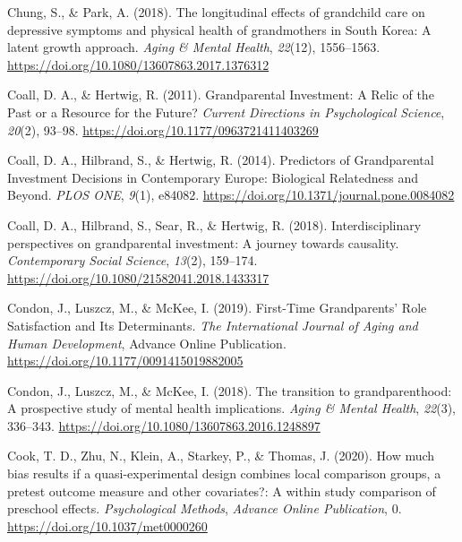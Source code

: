\documentclass[
  english,
  man, noextraspace]{apa7}
\begin{document}
\leavevmode\hypertarget{ref-chungLongitudinalEffectsGrandchild2018}{}%
Chung, S., \& Park, A. (2018). The longitudinal effects of grandchild care on depressive symptoms and physical health of grandmothers in South Korea: A latent growth approach. \emph{Aging \& Mental Health}, \emph{22}(12), 1556--1563. \url{https://doi.org/10.1080/13607863.2017.1376312}

\leavevmode\hypertarget{ref-coallGrandparentalInvestmentRelic2011}{}%
Coall, D. A., \& Hertwig, R. (2011). Grandparental Investment: A Relic of the Past or a Resource for the Future? \emph{Current Directions in Psychological Science}, \emph{20}(2), 93--98. \url{https://doi.org/10.1177/0963721411403269}

\leavevmode\hypertarget{ref-coallPredictorsGrandparentalInvestment2014}{}%
Coall, D. A., Hilbrand, S., \& Hertwig, R. (2014). Predictors of Grandparental Investment Decisions in Contemporary Europe: Biological Relatedness and Beyond. \emph{PLOS ONE}, \emph{9}(1), e84082. \url{https://doi.org/10.1371/journal.pone.0084082}

\leavevmode\hypertarget{ref-coallInterdisciplinaryPerspectivesGrandparental2018}{}%
Coall, D. A., Hilbrand, S., Sear, R., \& Hertwig, R. (2018). Interdisciplinary perspectives on grandparental investment: A journey towards causality. \emph{Contemporary Social Science}, \emph{13}(2), 159--174. \url{https://doi.org/10.1080/21582041.2018.1433317}

\leavevmode\hypertarget{ref-condonFirstTimeGrandparentsRole2019}{}%
Condon, J., Luszcz, M., \& McKee, I. (2019). First-Time Grandparents' Role Satisfaction and Its Determinants. \emph{The International Journal of Aging and Human Development}, Advance Online Publication. \url{https://doi.org/10.1177/0091415019882005}

\leavevmode\hypertarget{ref-condonTransitionGrandparenthoodProspective2018}{}%
Condon, J., Luszcz, M., \& McKee, I. (2018). The transition to grandparenthood: A prospective study of mental health implications. \emph{Aging \& Mental Health}, \emph{22}(3), 336--343. \url{https://doi.org/10.1080/13607863.2016.1248897}

\leavevmode\hypertarget{ref-cookHowMuchBias2020}{}%
Cook, T. D., Zhu, N., Klein, A., Starkey, P., \& Thomas, J. (2020). How much bias results if a quasi-experimental design combines local comparison groups, a pretest outcome measure and other covariates?: A within study comparison of preschool effects. \emph{Psychological Methods}, \emph{Advance Online Publication}, 0. \url{https://doi.org/10.1037/met0000260}
\end{document}
